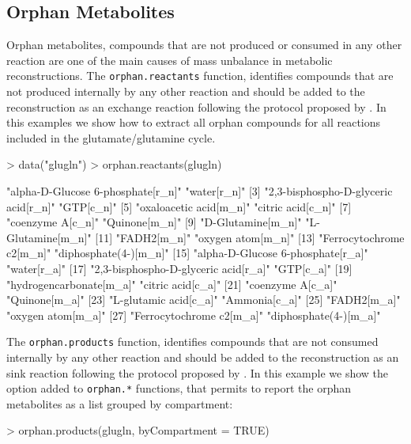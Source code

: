 \subsection*{Orphan Metabolites}
Orphan metabolites, compounds that are not produced or consumed in any other reaction are one of the main causes of mass unbalance in metabolic reconstructions. The \texttt{orphan.reactants} function, identifies compounds that are not produced internally by any other reaction and should be added to the reconstruction as an exchange reaction following the protocol proposed by \cite{Thiele2010}.  In this examples we show how to extract all orphan compounds for all reactions included in the glutamate/glutamine cycle.
\begin{Schunk}
\begin{Sinput}
> data("glugln")
> orphan.reactants(glugln)
\end{Sinput}
\begin{Soutput}
 [1] "alpha-D-Glucose 6-phosphate[r_n]"    "water[r_n]"                         
 [3] "2,3-bisphospho-D-glyceric acid[r_n]" "GTP[c_n]"                           
 [5] "oxaloacetic acid[m_n]"               "citric acid[c_n]"                   
 [7] "coenzyme A[c_n]"                     "Quinone[m_n]"                       
 [9] "D-Glutamine[m_n]"                    "L-Glutamine[m_n]"                   
[11] "FADH2[m_n]"                          "oxygen atom[m_n]"                   
[13] "Ferrocytochrome c2[m_n]"             "diphosphate(4-)[m_n]"               
[15] "alpha-D-Glucose 6-phosphate[r_a]"    "water[r_a]"                         
[17] "2,3-bisphospho-D-glyceric acid[r_a]" "GTP[c_a]"                           
[19] "hydrogencarbonate[m_a]"              "citric acid[c_a]"                   
[21] "coenzyme A[c_a]"                     "Quinone[m_a]"                       
[23] "L-glutamic acid[c_a]"                "Ammonia[c_a]"                       
[25] "FADH2[m_a]"                          "oxygen atom[m_a]"                   
[27] "Ferrocytochrome c2[m_a]"             "diphosphate(4-)[m_a]"               
\end{Soutput}
The \texttt{orphan.products} function, identifies compounds that are not consumed internally by any other reaction and should be added to the reconstruction as an sink reaction following the protocol proposed by \cite{Thiele2010}. In this example we show the option added to \texttt{orphan.*} functions, that permits to report the orphan metabolites as a list grouped by compartment:
\begin{Sinput}
> orphan.products(glugln, byCompartment = TRUE)
\end{Sinput}
\end{Schunk}
